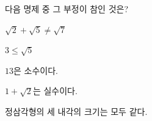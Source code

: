 다음 명제 중 그 부정이 참인 것은?
\begin{choicesii}{\rule[-3ex]{0pt}{8ex}$\sqrt{2}+\sqrt{5}\ne\sqrt{7}$}{\rule[-3ex]{0pt}{8ex}$3\le\sqrt{5}$}{\rule[-3ex]{0pt}{8ex}$13$은 소수이다.}{\rule[-3ex]{0pt}{8ex}$1+\sqrt{2}$는 실수이다.}{\rule[-3ex]{0pt}{8ex}정삼각형의 세 내각의 크기는 모두 같다.}\end{choicesii}
